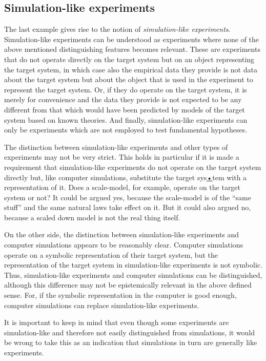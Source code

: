 \documentclass[onecollarge]{STJour}
\numberwithin{equation}{section}
\begin{document}
\subsection{Simulation-like experiments}

The last example gives rise to the notion of \emph{simulation-like experiments}. Simulation-like experiments can be understood as experiments where none of the above mentioned distinguishing features becomes relevant. These are experiments that do not operate directly on the target system but on an object representing the target system, in which case also the empirical data they provide is not data about the target system but about the object that is used in the experiment to represent the target system. Or, if they do operate on the target system, it is merely for convenience and the data they provide is not expected to be any different from that which would have been predicted by models of the target system based on known theories. And finally, simulation-like experiments can only be experiments which are not employed to test fundamental hypotheses.

The distinction between simulation-like experiments and other types of experiments may not be very strict. This holds in particular if it is made a requirement that simulation-like experiments do not operate on the target system directly but, like computer simulations, substitute the target sys\underline{\underline{•}}tem with a representation of it. Does a scale-model, for example, operate on the target system or not? It could be argued yes, because the scale-model is of the ``same stuff'' and the same natural laws take effect on it. But it could also argued no, because a scaled down model is not the real thing itself.

On the other side, the distinction between simulation-like experiments and computer simulations appears to be reasonably clear. Computer simulations operate on a symbolic representation of their target system, but the representation of the target system in simulation-like experiments is not symbolic. Thus, simulation-like experiments and computer simulations can be distinguished, although this difference may not be epistemically relevant in the above defined sense. For, if the symbolic representation in the computer is good enough, computer simulations can replace simulation-like experiments. 

It is important to keep in mind that even though some experiments are simulation-like and therefore not easily distinguished from simulations, it would be wrong to take this as an indication that simulations in turn are generally like experiments. 
\end{document}
